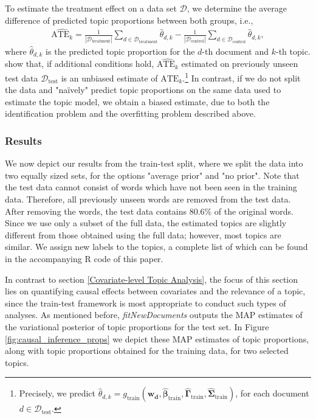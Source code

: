 To estimate the treatment effect on a data set $\mathcal{D}$, we determine the average difference of predicted topic proportions between both groups, i.e.,
\begin{align}
\widehat{\text{ATE}_k} = \frac{1}{|\mathcal{D}_{\text{treatment}}|}\sum_{d \in \mathcal{D}_{\text{treatment}}} \hat{\theta}_{d,k} - \frac{1}{|\mathcal{D}_{\text{control}}|}\sum_{d \in \mathcal{D}_{\text{control}}} \hat{\theta}_{d,k},
\end{align} 
where $\hat{\theta}_{d,k}$ is the predicted topic proportion for the $d$-th document and $k$-th topic. \cite{egami2018make} show that, if additional conditions hold, $\widehat{\text{ATE}_k}$ estimated on previously unseen test data $\mathcal{D}_{\text{test}}$ is an unbiased estimate of $\text{ATE}_k$.\footnote{Precisely, we predict $\hat{\theta}_{d,k} = g_{\text{train}}(\boldsymbol{w_d}, \hat{\boldsymbol{\beta}}_{\text{train}}, \hat{\boldsymbol{\Gamma}}_{\text{train}}, \hat{\boldsymbol{\Sigma}}_{\text{train}})$, for each document $d \in \mathcal{D}_{\text{test}}$.}
In contrast, if we do not split the data and "na{\"i}vely" predict topic proportions on the same data used to estimate the topic model, we obtain a biased estimate, due to both the identification problem and the overfitting problem described above.

\subsubsection{Results}
\label{Results}

We now depict our results from the train-test split, where we split the data into two equally sized sets, for the options "average prior" and "no prior". Note that the test data cannot consist of words which have not been seen in the training data. Therefore, all previously unseen words are removed from the test data. After removing the words, the test data contains 80.6\% of the original words. Since we use only a subset of the full data, the estimated topics are slightly different from those obtained using the full data; however, most topics are similar. We assign new labels to the topics, a complete list of which can be found in the accompanying R code of this paper.

In contrast to section \ref{Covariate-level Topic Analysis}, the focus of this section lies on quantifying causal effects between covariates and the relevance of a topic, since the train-test framework is most appropriate to conduct such types of analyses. As mentioned before, \textit{fitNewDocuments} outputs the MAP estimates of the variational posterior of topic proportions for the test set. In Figure \ref{fig:causal_inference_props} we depict these MAP estimates of topic proportions, along with topic proportions obtained for the training data, for two selected topics.

